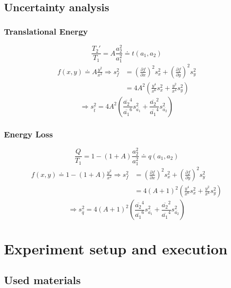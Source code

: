\documentclass{scrreprt}
\begin{document}
\subsection{Uncertainty analysis}
\subsubsection{Translational Energy}
\begin{equation}
\frac{T_2'}{T_1}=A\frac{a_2^2}{a_1^2}\doteq t(a_1,a_2)
\end{equation}
\begin{align}
f(x,y) \doteq A\frac{y^2}{x^2} \Longrightarrow
s_f^2 &= \left(\frac{\partial f}{\partial x}\right)^2 s_x^2 + \left(\frac{\partial f}{\partial y}\right)^2 s_y^2\\
&= 4 A^2 \left( \frac{y^4}{x^6} s_x^2 + \frac{y^2}{x^4} s_y^2 \right)
\end{align}
\begin{equation}
\Longrightarrow s_{\bar{t}}^2 = 4 A^2 \left(\frac{\overline{a_2}^4}{\overline{a_1}^6} s_{\overline{a_1}}^2 + \frac{\overline{a_2}^2}{\overline{a_1}^4} s_{\overline{a_2}}^2 \right)
\end{equation}

\subsubsection{Energy Loss}
\begin{equation}
\frac{Q}{T_1}= 1-(1+A) \frac{a_2^2}{a_1^2} \doteq q(a_1,a_2)
\end{equation}
\begin{align}
f(x,y) \doteq 1-(1+A)\frac{y^2}{x^2} \Longrightarrow
s_f^2 &= \left(\frac{\partial f}{\partial x}\right)^2 s_x^2 + \left(\frac{\partial f}{\partial y}\right)^2 s_y^2\\
&= 4 (A+1)^2 \left( \frac{y^4}{x^6} s_x^2 + \frac{y^2}{x^4} s_y^2 \right)
\end{align}
\begin{equation}
\Longrightarrow s_{\bar{q}}^2 = 4 (A+1)^2 \left(\frac{\overline{a_2}^4}{\overline{a_1}^6} s_{\overline{a_1}}^2 + \frac{\overline{a_2}^2}{\overline{a_1}^4} s_{\overline{a_2}}^2 \right)
\end{equation}

\section{Experiment setup and execution}

\subsection{Used materials}
\end{document}
